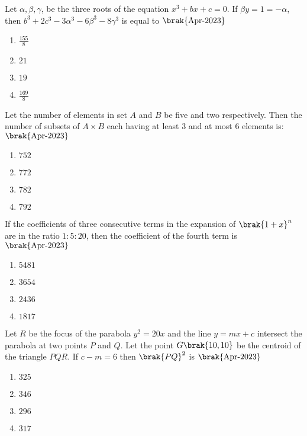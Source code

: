 \item{
Let $\alpha,\beta,\gamma$, be the three roots of the equation $x^3+bx+c=0$. If $\beta y=1=-\alpha$, then $b^3+2c^3-3\alpha^3-6\beta^3-8\gamma^3$ is equal to
\hfill{$\brak{\text{Apr-2023}}$}
\begin{multicols}{4}
\begin{enumerate}
\item $\frac{155}{8}$
\item $21$
\item $19$
\item $\frac{169}{8}$
\end{enumerate}
\end{multicols}
}
\item{
Let the number of elements in set $A$ and $B$ be five and two respectively. Then the number of subsets of $A\times B$ each having at least $3$ and at most $6$ elements is:
\hfill{$\brak{\text{Apr-2023}}$}
\begin{multicols}{4}
\begin{enumerate}
\item $752$
\item $772$
\item $782$
\item $792$
\end{enumerate}
\end{multicols}
}
\item{
If the coefficients of three consecutive terms in the expansion of $\brak{1+x}^n$ are in the ratio $1:5:20$, then the coefficient of the fourth term is 
\hfill{$\brak{\text{Apr-2023}}$}
\begin{multicols}{4}
\begin{enumerate}
\item $5481$
\item $3654$
\item $2436$
\item $1817$
\end{enumerate}
\end{multicols}

}
\item{
Let $R$ be the focus of the parabola $y^2=20x$ and the line $y=mx+c$ intersect the parabola at two points $P$ and $Q$. Let the point $G\brak{10,10}$ be the centroid of the triangle $PQR$. If $c-m=6$ then $\brak{PQ}^2$ is
\hfill{$\brak{\text{Apr-2023}}$}
\begin{multicols}{4}
\begin{enumerate}
\item $325$
\item $346$
\item $296$
\item $317$
\end{enumerate}
\end{multicols}
}
